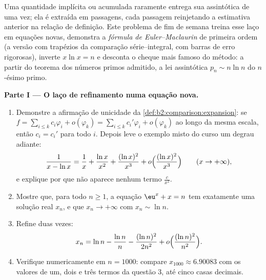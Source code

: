 Uma quantidade implícita ou acumulada raramente entrega sua
assintótica de uma vez; ela é extraída em passagens, cada passagem
reinjetando a estimativa anterior na relação de definição.
Este problema de fim de semana treina esse laço em equações novas, demonstra
a \emph{fórmula de Euler--Maclaurin} de primeira ordem (a versão
com trapézios da comparação série--integral, com barras de erro rigorosas),
inverte $x\ln x = n$ e desconta o cheque mais famoso do método:
a partir do teorema dos números primos admitido, a lei assintótica
$p_n \sim n\ln n$ do $n$-ésimo primo.

\begin{problem}
\label{pb:b2:comparison:1}

\medskip
\noindent\textbf{Parte I --- O laço de refinamento numa equação
nova.}
\begin{enumerate}
  \item Demonstre a afirmação de unicidade da
        \cref{def:b2:comparison:expansion}: se $f = \sum_{i\leq
        k} c_i\varphi_i + o(\varphi_k) = \sum_{i \leq k}
        c_i'\varphi_i + o(\varphi_k)$ ao longo da mesma escala, então
        $c_i = c_i'$ para todo $i$. Depois leve o
        exemplo misto do curso um degrau adiante:
        \[
        \frac{1}{x - \ln x} = \frac1x + \frac{\ln x}{x^2} +
        \frac{(\ln x)^2}{x^3} + o\Bigl(\frac{(\ln
        x)^2}{x^3}\Bigr) \qquad (x \to +\infty),
        \]
        e explique por que não aparece nenhum termo $\frac{c}{x^2}$.
  \item Mostre que, para todo $n \geq 1$, a equação $\eu^x + x =
        n$ tem exatamente uma solução real $x_n$, e que $x_n
        \to +\infty$ com $x_n \sim \ln n$.
  \item Refine duas vezes:
        \[
        x_n = \ln n - \frac{\ln n}{n} - \frac{(\ln n)^2}{2n^2} +
        o\Bigl(\frac{(\ln n)^2}{n^2}\Bigr).
        \]
  \item Verifique numericamente em $n = 1000$: compare $x_{1000}
        \approx 6.90083$ com os valores de um, dois e três termos
        da questão 3, até cinco casas decimais.
\end{enumerate}


\end{problem}
